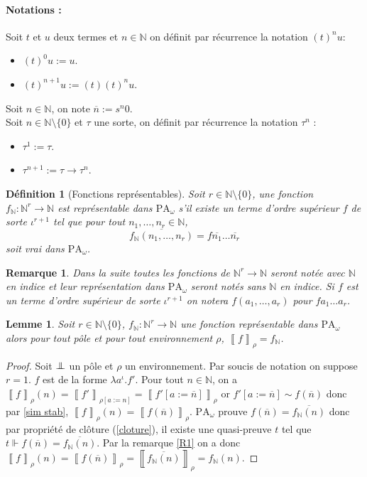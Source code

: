 \documentclass[a4paper,12pt]{article}
\newtheorem{defi}[theo]{Définition}
\newtheorem{lem}[theo]{Lemme}
\theoremstyle{rmqstyle}
\newtheorem{rmq}[theo]{Remarque}
\newcommand{\N}{\mathbb{N}}
\newcommand{\set}[1]{\{#1\}}
\newcommand{\itp}[1]{\left\llbracket#1\right\rrbracket}
\newcommand{\PA}{\mathrm{PA}}
\newcommand{\pole}{{\protect\mathpalette{\protect\polehelper}{\bot}}} \def\polehelper#1#2{\mathrel{\rlap{$#1#2$}\mkern3mu{#1#2}}}
\renewcommand{\bar}{\overline}
\begin{document}
\paragraph{Notations :} Soit $t$ et $u$ deux termes et $n \in \N$ on définit par récurrence la notation $(t)^n u$:
\begin{itemize}
\setlength\itemsep{ -1 em}
\item $(t)^0 u := u$.\\
\item $(t)^{n +1} u := (t)(t)^nu$.
\end{itemize}
Soit $n \in \N$, on note $\bar{n} := s^{n}0$.\\
Soit $n \in \N \setminus \set{0}$ et $\tau$ une sorte, on définit par récurrence la notation $\tau^n$ :
\begin{itemize}
\setlength\itemsep{ -1 em}
\item $\tau^1 := \tau$.\\
\item $\tau^{n +1} := \tau \to \tau^n$.
\end{itemize}

\begin{defi}[Fonctions représentables]
Soit $r \in \N \setminus \set{0}$, une fonction $f_\N : \N^r \to \N$ est représentable dans $\PA_\omega$ s'il existe un terme d'ordre supérieur $f$ de sorte $\iota^{r+1}$ tel que pour tout $n_1, \dots, n_r \in \N$,
$$\bar{f_\N(n_1, \dots, n_r)} = f \bar{n_1} \dots \bar{n_r}$$soit vrai dans $\PA_\omega$.
\end{defi}

\begin{rmq}
Dans la suite toutes les fonctions de $\N^r \to \N$ seront notée avec $\N$ en indice et leur représentation dans $\PA_\omega$ seront notés sans $\N$ en indice. Si $f$ est un terme d'ordre supérieur de sorte $\iota^{r+1}$ on notera $f(a_1, \dots, a_r)$ pour $f a_1 \dots a_r$.
\end{rmq}

\begin{lem}
\label{egal itp rep}
Soit $r \in \N \setminus \set{0}$, $f_\N : \N^r \to \N$ une fonction représentable dans $\PA_\omega$ alors pour tout pôle et pour tout environnement $\rho$, $\itp{f}_\rho = f_\N$.
\end{lem}

\begin{proof}
Soit $\pole$ un pôle et $\rho$ un environnement. Par soucis de notation on suppose $r = 1$. $f$ est de la forme $\lambda a^\iota. f'$. Pour tout $n \in \N$, on a $\itp{f}_\rho(n) = \itp{f'}_{\rho[a := n]} = \itp{f'[a := \bar{n}]}_\rho$ or $f'[a := \bar{n}] \sim f(\bar{n})$ donc par \ref{sim stab}, $\itp{f}_\rho(n) = \itp{f(\bar{n})}_\rho$. $\PA_\omega$ prouve $f(\bar{n}) = \bar{f_\N(n)}$ donc par propriété de clôture (\ref{cloture}), il existe une quasi-preuve $t$ tel que $t \Vdash f(\bar{n}) = \bar{f_\N(n)}$. Par la remarque \ref{R1} on a donc $\itp{f}_\rho(n) = \itp{f(\bar{n})}_\rho = \itp{\bar{f_\N(n)}}_\rho = f_\N(n)$.
\end{proof}
\end{document}
